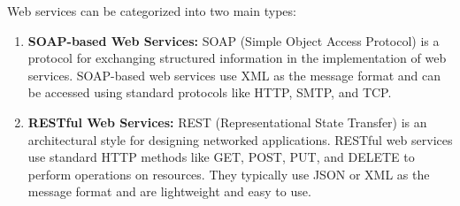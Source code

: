 \documentclass[11pt]{article}
\begin{document}
Web services can be categorized into two main types:

\begin{enumerate}
    \item \textbf{SOAP-based Web Services:} SOAP (Simple Object Access Protocol) is a protocol for exchanging structured information in the implementation of web services. SOAP-based web services use XML as the message format and can be accessed using standard protocols like HTTP, SMTP, and TCP.
    \item \textbf{RESTful Web Services:} REST (Representational State Transfer) is an architectural style for designing networked applications. RESTful web services use standard HTTP methods like GET, POST, PUT, and DELETE to perform operations on resources. They typically use JSON or XML as the message format and are lightweight and easy to use.
\end{enumerate}
\end{document}
